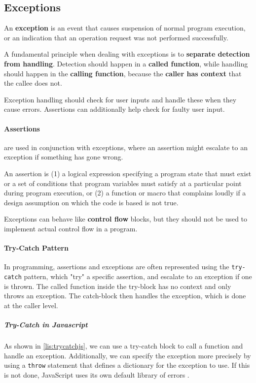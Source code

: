 \subsection{Exceptions}
An \textbf{exception} is an event that causes suspension of normal program execution, or an indication that an operation request was not performed successfully.

A fundamental principle when dealing with exceptions is to \textbf{separate detection from handling}. Detection should happen in a \textbf{called function}, while handling should happen in the \textbf{calling function}, because the \textbf{caller has context} that the callee does not.

Exception handling should check for user inputs and handle these when they cause errors. Assertions can additionally help check for faulty user input.

\paragraph{Assertions} are used in conjunction with exceptions, where an assertion might escalate to an exception if something has gone wrong.

An assertion is (1) a logical expression specifying a program state that must exist or a set of conditions that program variables must satisfy at a particular point during program execution, or (2) a function or macro that complains loudly if a design assumption on which the code is based is not true.

Exceptions can behave like \textbf{control flow} blocks, but they should not be used to implement actual control flow in a program. 

\paragraph{Try-Catch Pattern} In programming, assertions and exceptions are often represented using the \texttt{try-catch} pattern, which "try" a specific assertion, and escalate to an exception if one is thrown. The called function inside the try-block has no context and only throws an exception. The catch-block then handles the exception, which is done at the caller level.

\subparagraph{Try-Catch in Javascript} As shown in \autoref{lis:trycatchjs}, we can use a try-catch block to call a function and handle an exception. Additionally, we can specify the exception more precisely by using a \texttt{throw} statement that defines a dictionary for the exception to use. If this is not done, JavaScript uses its own default library of errors \cite{jserror}.

